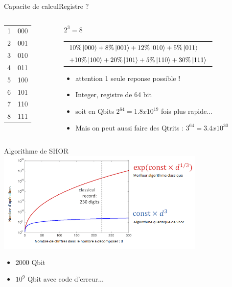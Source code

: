 \documentclass{beamer}
\begin{document}
\begin{frame}{Capacite de calcul}{Registre ?}
  \begin{columns}
    \begin{column}{0.25\textwidth}
      \begin{table}
        \begin{tabular}{ll}
          1 & 000\\
          2 & 001\\
          3 & 010\\
          4 & 011\\
          5 & 100\\
          6 & 101\\
          7 & 110\\
          8 & 111\\
        \end{tabular}
      \end{table}
    \end{column}
    \begin{column}{0.75\textwidth}
      \begin{table}
        $2^3 = 8$
        \begin{tabular}{l}
          $10\%\ket{000}+8\%\ket{001}+12\%\ket{010}+5\%\ket{011}$\\
          $+10\%\ket{100}+20\%\ket{101}+5\%\ket{110}+30\%\ket{111}$\\
        \end{tabular}
      \end{table}
      \begin{itemize}
      \item attention 1 seule reponse possible !
      \item Integer, registre de 64 bit 
      \item soit en Qbits $2^{64} = 1.8x10^{19}$ fois plus rapide...
      \item Mais on peut aussi faire des Qtrits : $3^{64} = 3.4x10^{30}$
      \end{itemize}
    \end{column}
  \end{columns}
\end{frame}

\begin{frame}{Algorithme de SHOR}{}
  \includegraphics[height=5cm]{shor.png}
  \begin{itemize}
  \item 2000 Qbit 
  \item $10^9$ Qbit avec code d'erreur...
  \end{itemize}
\end{frame}
\end{document}
